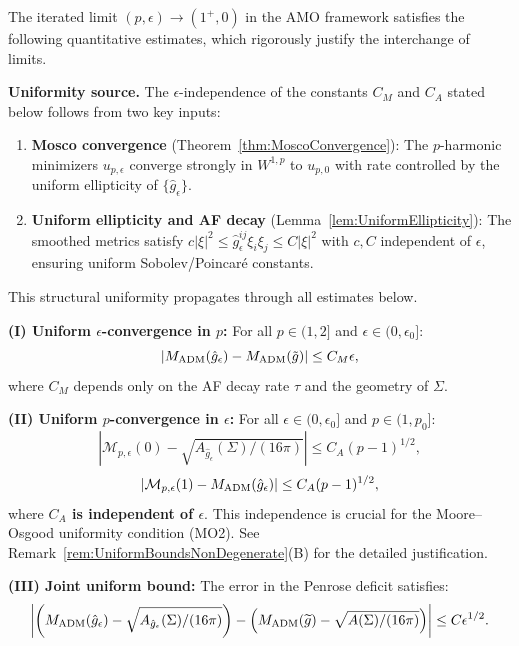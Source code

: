\begin{theorem}\label{thm:CompleteDblLimit}
The iterated limit $(p, \epsilon) \to (1^+, 0)$ in the AMO framework satisfies the following quantitative estimates, which rigorously justify the interchange of limits.

\textbf{Uniformity source.} The $\epsilon$-independence of the constants $C_M$ and $C_A$ stated below follows from two key inputs:
\begin{enumerate}
    \item \textbf{Mosco convergence} (Theorem~\ref{thm:MoscoConvergence}): The $p$-harmonic minimizers $u_{p,\epsilon}$ converge strongly in $W^{1,p}$ to $u_{p,0}$ with rate controlled by the uniform ellipticity of $\{\hat{g}_\epsilon\}$.
    \item \textbf{Uniform ellipticity and AF decay} (Lemma~\ref{lem:UniformEllipticity}): The smoothed metrics satisfy $c|\xi|^2 \le \hat{g}_\epsilon^{ij}\xi_i\xi_j \le C|\xi|^2$ with $c, C$ independent of $\epsilon$, ensuring uniform Sobolev/Poincar\'e constants.
\end{enumerate}
This structural uniformity propagates through all estimates below.

\textbf{(I) Uniform $\epsilon$-convergence in $p$:} For all $p \in (1, 2]$ and $\epsilon \in (0, \epsilon_0]$:
\begin{equation}
    |M_{\mathrm{ADM}}(\hat{g}_\epsilon) - M_{\mathrm{ADM}}(\tilde{g})| \le C_M \epsilon,
\end{equation}
where $C_M$ depends only on the AF decay rate $\tau$ and the geometry of $\Sigma$.

\textbf{(II) Uniform $p$-convergence in $\epsilon$:} For all $\epsilon \in (0, \epsilon_0]$ and $p \in (1, p_0]$:
\begin{equation}
    |\mathcal{M}_{p,\epsilon}(0) - \sqrt{A_{\hat{g}_\epsilon}(\Sigma)/(16\pi)}| \le C_A (p-1)^{1/2},
\end{equation}
\begin{equation}
    |\mathcal{M}_{p,\epsilon}(1) - M_{\mathrm{ADM}}(\hat{g}_\epsilon)| \le C_A (p-1)^{1/2},
\end{equation}
where \textbf{$C_A$ is independent of $\epsilon$}. This independence is crucial for the Moore--Osgood uniformity condition (MO2). See Remark~\ref{rem:UniformBoundsNonDegenerate}(B) for the detailed justification.

\textbf{(III) Joint uniform bound:} The error in the Penrose deficit satisfies:
\begin{equation}
    \left| \left( M_{\mathrm{ADM}}(\hat{g}_\epsilon) - \sqrt{A_{\hat{g}_\epsilon}(\Sigma)/(16\pi)} \right) - \left( M_{\mathrm{ADM}}(\widetilde{g}) - \sqrt{A(\Sigma)/(16\pi)} \right) \right| \le C \epsilon^{1/2}.
\end{equation}


\end{theorem}

